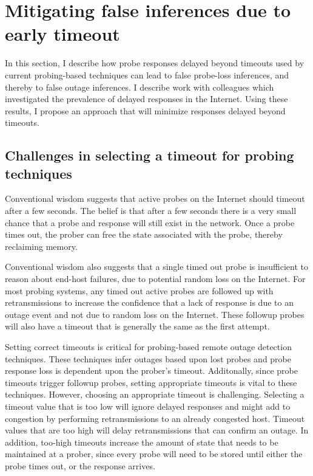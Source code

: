 
\section{Mitigating false inferences due to early timeout}
\label{sec:timeouts}

In this section, I describe how probe responses delayed beyond
timeouts used by current probing-based techniques can lead to false
probe-loss inferences, and thereby to false outage inferences. I 
describe work with colleagues which
investigated the prevalence of delayed responses in the
Internet. Using these results, I propose an approach that will minimize responses
delayed beyond timeouts.

\subsection{Challenges in selecting a timeout for probing techniques}

Conventional wisdom suggests that active probes on the Internet should timeout
after a few seconds. The belief is that after a few seconds there is a very
small chance that a probe and response will still exist in the
network. Once a probe times out, the prober can free the state
associated with the probe, thereby reclaiming memory.

Conventional wisdom also suggests that a single timed out probe is
insufficient to reason about end-host failures, due to potential random loss on
the Internet. %
For most probing systems, any timed out active probes are followed up with
retransmissions to increase the confidence that a lack of response is due to
an outage event and not due to random loss on the Internet. These followup probes will also have a timeout that
is generally the same as the first attempt. 

Setting correct timeouts is critical for
probing-based remote outage detection techniques. These techniques infer outages
based upon lost probes and probe response loss is
dependent upon the prober's timeout. Additonally, since probe timeouts trigger followup probes, setting appropriate
timeouts is vital to these techniques. However, choosing an appropriate timeout is
challenging. Selecting a timeout value that is too low will ignore delayed
responses and might add to congestion by performing retransmissions to an
already congested host. Timeout values that are too high will delay
retransmissions that can confirm an outage. In addition, too-high timeouts
increase the amount of state that needs to be maintained at a prober, since
every probe will need to be stored until either the probe times out,
or the response arrives.

